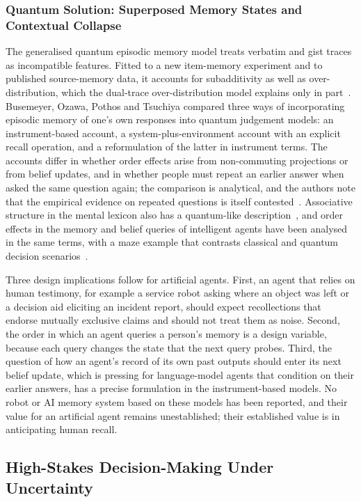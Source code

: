 \documentclass[pdflatex,sn-basic]{sn-jnl}
\begin{document}
\subsubsection{Quantum Solution: Superposed Memory States and Contextual Collapse}
The generalised quantum episodic memory model treats verbatim and gist traces as incompatible features. Fitted to a new item-memory experiment and to published source-memory data, it accounts for subadditivity as well as over-distribution, which the dual-trace over-distribution model explains only in part~\citep{Trueblood2017b}. Busemeyer, Ozawa, Pothos and Tsuchiya compared three ways of incorporating episodic memory of one's own responses into quantum judgement models: an instrument-based account, a system-plus-environment account with an explicit recall operation, and a reformulation of the latter in instrument terms. The accounts differ in whether order effects arise from non-commuting projections or from belief updates, and in whether people must repeat an earlier answer when asked the same question again; the comparison is analytical, and the authors note that the empirical evidence on repeated questions is itself contested~\citep{Busemeyer2025}. Associative structure in the mental lexicon also has a quantum-like description~\citep{Bruza2009}, and order effects in the memory and belief queries of intelligent agents have been analysed in the same terms, with a maze example that contrasts classical and quantum decision scenarios~\citep{Kak2018}.

Three design implications follow for artificial agents. First, an agent that relies on human testimony, for example a service robot asking where an object was left or a decision aid eliciting an incident report, should expect recollections that endorse mutually exclusive claims and should not treat them as noise. Second, the order in which an agent queries a person's memory is a design variable, because each query changes the state that the next query probes. Third, the question of how an agent's record of its own past outputs should enter its next belief update, which is pressing for language-model agents that condition on their earlier answers, has a precise formulation in the instrument-based models. No robot or AI memory system based on these models has been reported, and their value for an artificial agent remains unestablished; their established value is in anticipating human recall.

\subsection{High-Stakes Decision-Making Under Uncertainty}\label{sec:decision}
\end{document}
